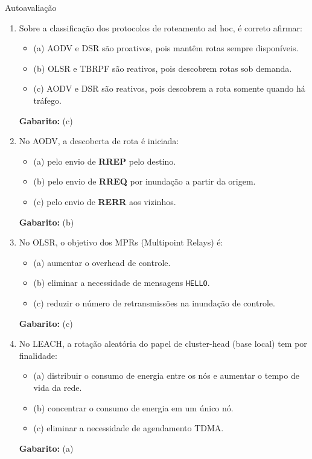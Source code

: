 \documentclass[aspectratio=169,11pt]{beamer}
\begin{document}
\begin{frame}{Autoavaliação}
  \begin{enumerate}
    \item Sobre a classificação dos protocolos de roteamento ad hoc, é correto afirmar:
      \begin{itemize}
        \item (a) AODV e DSR são proativos, pois mantêm rotas sempre disponíveis.
        \item (b) OLSR e TBRPF são reativos, pois descobrem rotas sob demanda.
        \item (c) AODV e DSR são reativos, pois descobrem a rota somente quando há tráfego.
      \end{itemize}
      \pause
      \textbf{Gabarito:} (c)
    \item No AODV, a descoberta de rota é iniciada:
      \begin{itemize}
        \item (a) pelo envio de \textbf{RREP} pelo destino.
        \item (b) pelo envio de \textbf{RREQ} por inundação a partir da origem.
        \item (c) pelo envio de \textbf{RERR} aos vizinhos.
      \end{itemize}
      \pause
      \textbf{Gabarito:} (b)
    \item No OLSR, o objetivo dos MPRs (Multipoint Relays) é:
      \begin{itemize}
        \item (a) aumentar o overhead de controle.
        \item (b) eliminar a necessidade de mensagens \texttt{HELLO}.
        \item (c) reduzir o número de retransmissões na inundação de controle.
      \end{itemize}
      \pause
      \textbf{Gabarito:} (c)
    \item No LEACH, a rotação aleatória do papel de cluster-head (base local) tem por finalidade:
      \begin{itemize}
        \item (a) distribuir o consumo de energia entre os nós e aumentar o tempo de vida da rede.
        \item (b) concentrar o consumo de energia em um único nó.
        \item (c) eliminar a necessidade de agendamento TDMA.
      \end{itemize}
      \pause
      \textbf{Gabarito:} (a)
  \end{enumerate}
\end{frame}
\end{document}
